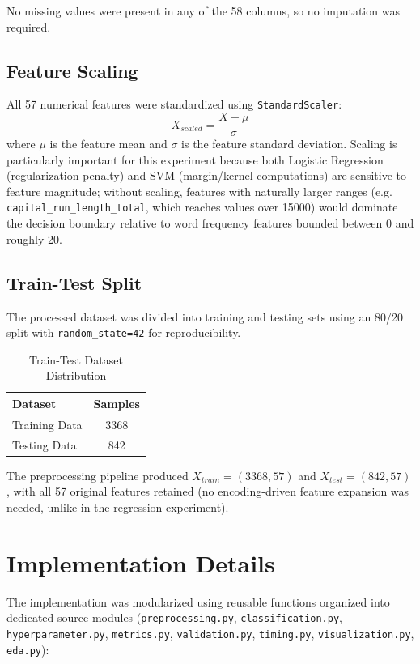 \documentclass[12pt,a4paper]{article}
\begin{document}
No missing values were present in any of the 58 columns, so no imputation was required.

\subsection{Feature Scaling}

All 57 numerical features were standardized using \texttt{StandardScaler}:
\[
X_{scaled} = \frac{X-\mu}{\sigma}
\]
where $\mu$ is the feature mean and $\sigma$ is the feature standard deviation. Scaling is particularly important for this experiment because both Logistic Regression (regularization penalty) and SVM (margin/kernel computations) are sensitive to feature magnitude; without scaling, features with naturally larger ranges (e.g. \texttt{capital\_run\_length\_total}, which reaches values over 15000) would dominate the decision boundary relative to word frequency features bounded between 0 and roughly 20.

\subsection{Train-Test Split}

The processed dataset was divided into training and testing sets using an 80/20 split with \texttt{random\_state=42} for reproducibility.

\begin{table}[H]
\centering
\begin{tabular}{lc}
\toprule
Dataset & Samples \\
\midrule
Training Data & 3368 \\
Testing Data & 842 \\
\bottomrule
\end{tabular}
\caption{Train-Test Dataset Distribution}
\end{table}

The preprocessing pipeline produced $X_{train} = (3368, 57)$ and $X_{test} = (842, 57)$, with all 57 original features retained (no encoding-driven feature expansion was needed, unlike in the regression experiment).

\section{Implementation Details}

The implementation was modularized using reusable functions organized into dedicated source modules (\texttt{preprocessing.py}, \texttt{classification.py}, \texttt{hyperparameter.py}, \texttt{metrics.py}, \texttt{validation.py}, \texttt{timing.py}, \texttt{visualization.py}, \texttt{eda.py}):
\end{document}

